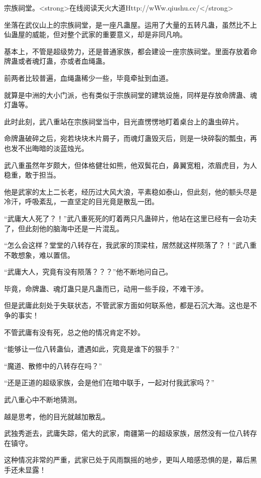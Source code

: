 
\begin{this_body}

宗族祠堂。<strong>在线阅读天火大道Http://wWw.qiushu.cc/</strong>

坐落在武仪山上的宗族祠堂，是一座凡蛊屋。运用了大量的五转凡蛊，虽然比不上仙蛊屋的威能，但对整个武家的重要意义，却是非同凡响。

基本上，不管是超级势力，还是普通家族，都会建设一座宗族祠堂。里面存放着命牌蛊或者魂灯蛊，亦或者血绳蛊。

前两者比较普遍，血绳蛊稀少一些，毕竟牵扯到血道。

就算是中洲的大小门派，也有类似于宗族祠堂的建筑设施，同样是存放命牌蛊、魂灯蛊等。

此时此刻，武八重站在宗族祠堂当中，目光直愣愣地盯着桌台上的蛊虫碎片。

命牌蛊破碎之后，宛若块块木片屑子，而魂灯蛊毁灭后，则是一块碎裂的瓢虫，再也发不出晦暗的淡蓝烛光。

武八重虽然年岁颇大，但体格健壮如熊，他双鬓花白，鼻翼宽粗，浓眉虎目，为人稳重，敢于担当。

他是武家的太上二长老，经历过大风大浪，平素稳如泰山，但此刻，他的额头尽是冷汗，呼吸紊乱，一直坚定的目光竟是散乱一团。

“武庸大人死了？！”武八重死死的盯着两只凡蛊碎片，他站在这里已经有一会功夫了，但此刻他的脑海中还是一片混乱。

“怎么会这样？堂堂的八转存在，我武家的顶梁柱，居然就这样陨落了？！”武八重不敢想象，难以置信。

“武庸大人，究竟有没有陨落？？？”他不断地问自己。

毕竟，命牌蛊、魂灯蛊只是凡蛊而已，动用一些手段，不难干涉。

但是武庸此刻处于失联状态，不管武家方面如何联系他，都是石沉大海。这也是不争的事实！

不管武庸有没有死，总之他的情况肯定不妙。

“能够让一位八转蛊仙，遭遇如此，究竟是谁下的狠手？”

“魔道、散修中的八转存在吗？”

“还是正道的超级家族，会是他们在暗中联手，一起对付我武家吗？”

武八重心中不断地猜测。

越是思考，他的目光就越加散乱。

武独秀逝去，武庸失踪，偌大的武家，南疆第一的超级家族，居然没有一位八转存在镇守。

这种情况非常的严重，武家已处于风雨飘摇的地步，更叫人暗感恐惧的是，幕后黑手还未显露！


\end{this_body}

